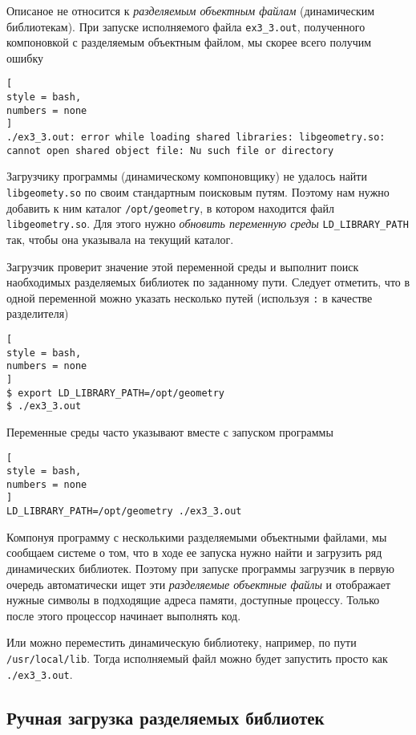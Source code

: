 \documentclass[%
	11pt,
	a4paper,
	utf8,
		]{article}
\begin{document}
Описаное не относится к \emph{разделяемым объектным файлам} (динамическим библиотекам). При запуске исполняемого файла \verb|ex3_3.out|, полученного компоновкой с разделяемым объектным файлом, мы скорее всего получим ошибку
\begin{lstlisting}[
style = bash,
numbers = none
]
./ex3_3.out: error while loading shared libraries: libgeometry.so: cannot open shared object file: Nu such file or directory
\end{lstlisting}

Загрузчику программы (динамическому компоновщику) не удалось найти \verb|libgeomety.so| по своим стандартным поисковым путям. Поэтому нам нужно добавить к ним каталог \verb|/opt/geometry|, в котором находится файл \verb|libgeometry.so|. Для этого нужно \emph{обновить переменную среды} \verb|LD_LIBRARY_PATH| так, чтобы она указывала на текущий каталог.

Загрузчик проверит значение этой переменной среды и выполнит поиск наобходимых разделяемых библиотек по заданному пути. Следует отметить, что в одной переменной можно указать несколько путей (используя \verb|:| в качестве разделителя)
\begin{lstlisting}[
style = bash,
numbers = none
]
$ export LD_LIBRARY_PATH=/opt/geometry
$ ./ex3_3.out
\end{lstlisting}

Переменные среды часто указывают вместе с запуском программы 
\begin{lstlisting}[
style = bash,
numbers = none
]
LD_LIBRARY_PATH=/opt/geometry ./ex3_3.out
\end{lstlisting}

Компонуя программу с несколькими разделяемыми объектными файлами, мы сообщаем системе о том, что в ходе ее запуска нужно найти и загрузить ряд динамических библиотек. Поэтому при запуске программы загрузчик в первую очередь автоматически ищет эти \emph{разделяемые объектные файлы} и отображает нужные символы в подходящие адреса памяти, доступные процессу. Только после этого процессор начинает выполнять код.

Или можно переместить динамическую библиотеку, например, по пути \verb|/usr/local/lib|. Тогда исполняемый файл можно будет запустить просто как \verb|./ex3_3.out|.

\subsection{Ручная загрузка разделяемых библиотек}
\end{document}

